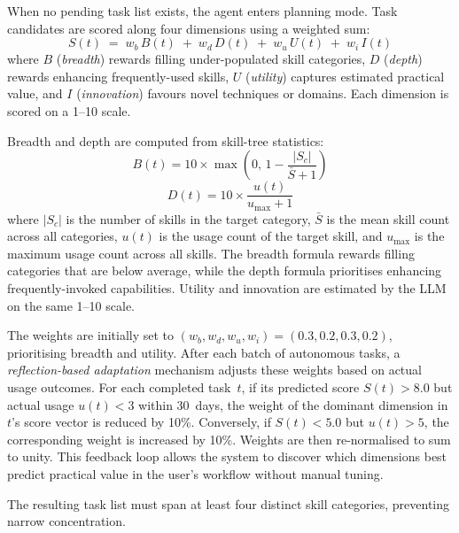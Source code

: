 When no pending task list exists, the agent enters planning mode.
Task candidates are scored along four dimensions using a weighted
sum:
%
\begin{equation}
  S(t) \;=\; w_b\,B(t) \;+\; w_d\,D(t) \;+\; w_u\,U(t) \;+\; w_i\,I(t)
  \label{eq:task-score}
\end{equation}
%
\noindent where $B$ (\emph{breadth}) rewards filling under-populated
skill categories, $D$ (\emph{depth}) rewards enhancing frequently-used
skills, $U$ (\emph{utility}) captures estimated practical value, and
$I$ (\emph{innovation}) favours novel techniques or domains.  Each
dimension is scored on a 1--10 scale.

Breadth and depth are computed from skill-tree statistics:
%
\begin{equation}
  B(t) = 10 \times \max\left(0,\, 1 - \frac{|S_c|}{\bar{S} + 1}\right)
  \label{eq:breadth}
\end{equation}
%
\begin{equation}
  D(t) = 10 \times \frac{u(t)}{u_{\max} + 1}
  \label{eq:depth}
\end{equation}
%
\noindent where $|S_c|$ is the number of skills in the target
category, $\bar{S}$ is the mean skill count across all categories,
$u(t)$ is the usage count of the target skill, and $u_{\max}$ is the
maximum usage count across all skills.  The breadth formula rewards
filling categories that are below average, while the depth formula
prioritises enhancing frequently-invoked capabilities.  Utility and
innovation are estimated by the LLM on the same 1--10 scale.

The weights are initially set to $(w_b, w_d, w_u, w_i) = (0.3, 0.2,
0.3, 0.2)$, prioritising breadth and utility.  After each batch of
autonomous tasks, a \emph{reflection-based adaptation} mechanism
adjusts these weights based on actual usage outcomes.  For each
completed task~$t$, if its predicted score $S(t) > 8.0$ but actual
usage $u(t) < 3$ within 30~days, the weight of the dominant dimension
in $t$'s score vector is reduced by 10\%.  Conversely, if $S(t) <
5.0$ but $u(t) > 5$, the corresponding weight is increased by 10\%.
Weights are then re-normalised to sum to unity.  This feedback loop
allows the system to discover which dimensions best predict practical
value in the user's workflow without manual tuning.

The resulting task list must span at least four distinct skill
categories, preventing narrow concentration.

